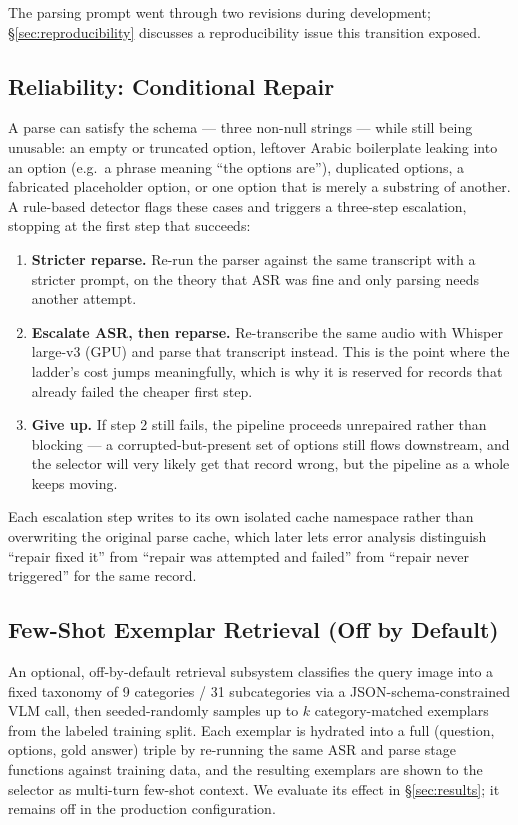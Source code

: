 \documentclass[11pt]{article}
\begin{document}
The parsing prompt went through two revisions during development; \S\ref{sec:reproducibility} discusses a reproducibility issue this transition exposed.

\subsection{Reliability: Conditional Repair}
\label{sec:repair}

A parse can satisfy the schema --- three non-null strings --- while still being unusable: an empty or truncated option, leftover Arabic boilerplate leaking into an option (e.g.\ a phrase meaning ``the options are''), duplicated options, a fabricated placeholder option, or one option that is merely a substring of another. A rule-based detector flags these cases and triggers a three-step escalation, stopping at the first step that succeeds:
\begin{enumerate}
  \item \textbf{Stricter reparse.} Re-run the parser against the same transcript with a stricter prompt, on the theory that ASR was fine and only parsing needs another attempt.
  \item \textbf{Escalate ASR, then reparse.} Re-transcribe the same audio with Whisper large-v3 (GPU) and parse that transcript instead. This is the point where the ladder's cost jumps meaningfully, which is why it is reserved for records that already failed the cheaper first step.
  \item \textbf{Give up.} If step 2 still fails, the pipeline proceeds unrepaired rather than blocking --- a corrupted-but-present set of options still flows downstream, and the selector will very likely get that record wrong, but the pipeline as a whole keeps moving.
\end{enumerate}
Each escalation step writes to its own isolated cache namespace rather than overwriting the original parse cache, which later lets error analysis distinguish ``repair fixed it'' from ``repair was attempted and failed'' from ``repair never triggered'' for the same record.

\subsection{Few-Shot Exemplar Retrieval (Off by Default)}
\label{sec:retrieval}

An optional, off-by-default retrieval subsystem classifies the query image into a fixed taxonomy of 9 categories / 31 subcategories via a JSON-schema-constrained VLM call, then seeded-randomly samples up to $k$ category-matched exemplars from the labeled training split. Each exemplar is hydrated into a full (question, options, gold answer) triple by re-running the same ASR and parse stage functions against training data, and the resulting exemplars are shown to the selector as multi-turn few-shot context. We evaluate its effect in \S\ref{sec:results}; it remains off in the production configuration.
\end{document}
